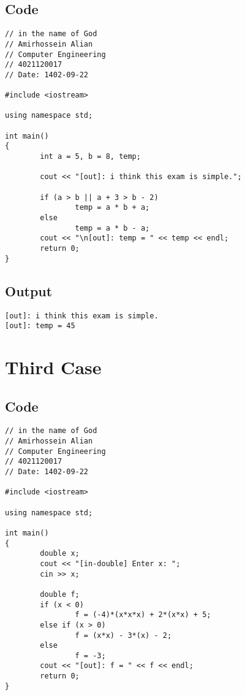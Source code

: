 \documentclass[12pt]{article}
\begin{document}
	\subsection{Code}
    \begin{tcolorbox}[breakable, size=fbox, boxrule=1pt, pad at break*=1mm, colback=cellbackground, colframe=cellborder]
\begin{verbatim}
// in the name of God
// Amirhossein Alian
// Computer Engineering
// 4021120017
// Date: 1402-09-22

#include <iostream>

using namespace std;

int main()
{
        int a = 5, b = 8, temp;

        cout << "[out]: i think this exam is simple.";

        if (a > b || a + 3 > b - 2)
                temp = a * b + a;
        else
                temp = a * b - a;
        cout << "\n[out]: temp = " << temp << endl;
        return 0;
}
\end{verbatim}
\end{tcolorbox}

	\subsection{Output}
    \begin{tcolorbox}[breakable, size=fbox, boxrule=1pt, pad at break*=1mm, colback=cellbackground, colframe=cellborder]
\begin{Verbatim}[commandchars=\\\{\}]
[out]: i think this exam is simple.
[out]: temp = 45
\end{Verbatim}
\end{tcolorbox}

\pagebreak
	\section{Third Case}
	
	\subsection{Code}
   \begin{tcolorbox}[breakable, size=fbox, boxrule=1pt, pad at break*=1mm, colback=cellbackground, colframe=cellborder]
\begin{verbatim}
// in the name of God
// Amirhossein Alian
// Computer Engineering
// 4021120017
// Date: 1402-09-22

#include <iostream>

using namespace std;

int main()
{
        double x;
        cout << "[in-double] Enter x: ";
        cin >> x;

        double f;
        if (x < 0)
                f = (-4)*(x*x*x) + 2*(x*x) + 5;
        else if (x > 0)
                f = (x*x) - 3*(x) - 2;
        else
                f = -3;
        cout << "[out]: f = " << f << endl;
        return 0;
}
\end{verbatim}
\end{tcolorbox}
\end{document}
